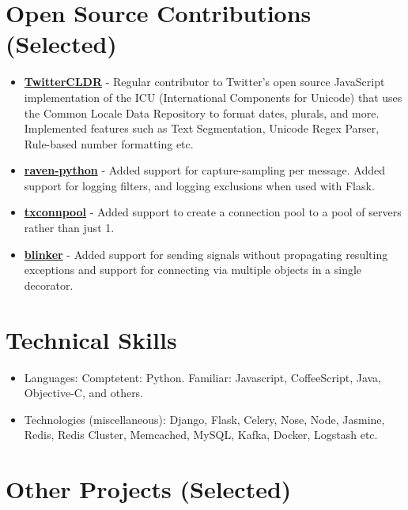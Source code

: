 \section{Open Source Contributions
(Selected)}\label{open-source-contributions-selected}

\begin{itemize}
\tightlist
\item
  \href{https://github.com/twitter/twitter-cldr-js}{\textbf{TwitterCLDR}}
  - Regular contributor to Twitter's open source JavaScript
  implementation of the ICU (International Components for Unicode) that
  uses the Common Locale Data Repository to format dates, plurals, and
  more. Implemented features such as Text Segmentation, Unicode Regex
  Parser, Rule-based number formatting etc.
\item
  \href{https://github.com/getsentry/raven-python}{\textbf{raven-python}}
  - Added support for capture-sampling per message. Added support for
  logging filters, and logging exclusions when used with Flask.
\item
  \href{https://github.com/zopim/txconnpool}{\textbf{txconnpool}} -
  Added support to create a connection pool to a pool of servers rather
  than just 1.
\item
  \href{https://github.com/zopim/blinker}{\textbf{blinker}} - Added
  support for sending signals without propagating resulting exceptions
  and support for connecting via multiple objects in a single decorator.
\end{itemize}

\section{Technical Skills}\label{technical-skills}

\begin{itemize}
\tightlist
\item
  Languages: Comptetent: Python. Familiar: Javascript, CoffeeScript,
  Java, Objective-C, and others.
\item
  Technologies (miscellaneous): Django, Flask, Celery, Nose, Node,
  Jasmine, Redis, Redis Cluster, Memcached, MySQL, Kafka, Docker,
  Logstash etc.
\end{itemize}

\section{Other Projects (Selected)}\label{other-projects-selected}

